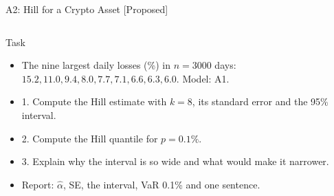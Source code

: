 \begin{frame}{A2: Hill for a Crypto Asset [Proposed]}
\propsub
\itemsize{\scriptsize}
\begin{columns}[T]
\begin{column}{\taskw}
\begin{block}{Task}
\begin{itemize}
    \item The nine largest daily losses (\%) in $n = 3000$ days: $15.2, 11.0, 9.4, 8.0, 7.7, 7.1, 6.6, 6.3, 6.0$. Model: A1.
    \item 1. Compute the Hill estimate with $k = 8$, its standard error and the 95\% interval.
    \item 2. Compute the Hill quantile for $p = 0.1\%$.
    \item 3. Explain why the interval is so wide and what would make it narrower.
    \item Report: $\hat\alpha$, SE, the interval, VaR 0.1\% and one sentence.
\end{itemize}
\end{block}
\end{column}
\begin{column}{\solw}
\end{column}
\end{columns}
\end{frame}

